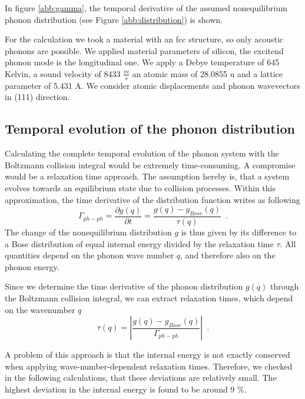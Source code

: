 \documentclass[ aps, prb, reprint, groupedaddress]{revtex4-1}
\begin{document}
In figure \ref{abb:gamma}, the temporal derivative of the assumed nonequilibrium phonon distribution (see Figure \ref{abb:distribution}) is shown.

For the calculation we took a material with an fcc structure, so only acoustic phonons are possible. We applied material parameters of silicon, the excitend phonon mode is the longitudinal one.
We apply a Debye temperature of 645 Kelvin, a sound velocity of 8433 $\frac{m}{s}$ an atomic mass of 28.0855 u and a lattice parameter of 5.431 A. We consider atomic displacements and phonon wavevectors in 
(111) direction.



\subsection{Temporal evolution of the phonon distribution}


Calculating the complete temporal evolution of the phonon system with the Boltzmann collision integral would be extremely time-consuming. A compromise would be a relaxation time approach.
The assumption hereby is, that a system evolves towards an equilibrium state due to collision processes.
Within this approximation, the time derivative of the distribution function writes as following
\begin{equation}
\Gamma_{ph-ph}= \frac{\partial g(q)}{\partial t} = \frac{g(q)-g_{Bose}(q)}{\tau(q)} \enspace .
\label{eq:relaxationapp}
\end{equation}
The change of the nonequilibrium distribution $g$ is thus given by its difference to a Bose distribution of equal internal energy divided by the relaxation time $\tau$. 
All quantities depend on the phonon wave number $q$, and therefore also on the phonon energy.

Since we determine the time derivative of the phonon distribution $g(q)$ through the Boltzmann collision integral, we can extract relaxation times, which depend on the wavenumber $q$
\begin{equation}
  \tau(q)= \left |\frac{g(q)-g_{Bose}(q)}{\Gamma_{ph-ph}} \right | \enspace .
  \label{eq:relaxationtimes}
\end{equation}

A problem of this approach is that the internal energy is not exactly conserved when applying wave-number-dependent relaxation times. Therefore, we checked in the following calculations, that these deviations are 
relatively small. The highest deviation in the internal energy is found to be around 9 \%. 
\end{document}
